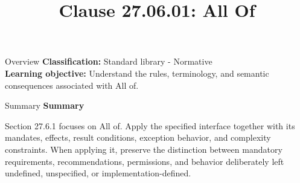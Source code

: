 \documentclass[10pt,letterpaper]{article}
\title{Clause 27.06.01: All Of}
\author{}
\date{}
\begin{document}
\maketitle
\begin{CornellOverviewBox}{Overview}
\textbf{Classification:} Standard library - Normative\\[2pt]
\textbf{Learning objective:} Understand the rules, terminology, and semantic consequences associated with All of.
\end{CornellOverviewBox}\begin{CornellSummaryBox}{Summary}
{\sffamily\bfseries\color{Accent} Summary}\par\vspace{3pt}Section 27.6.1 focuses on All of. Apply the specified interface together with its mandates, effects, result conditions, exception behavior, and complexity constraints. When applying it, preserve the distinction between mandatory requirements, recommendations, permissions, and behavior deliberately left undefined, unspecified, or implementation-defined.
\end{CornellSummaryBox}
\end{document}
